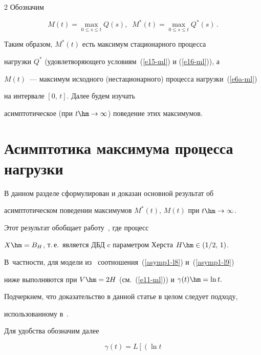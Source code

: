 \begin{multicols}{2}
Обозначим


\begin{equation*}


M(t)=\max\limits_{0 \leq s \leq t}Q(s),\;\; M^*(t)=\max\limits_{0 \leq s \leq


t}Q^*(s)\,. 




\end{equation*}


Таким образом, $M^*(t)$  есть  максимум стационарного процесса


нагрузки $Q^*$ (удовлетворяющего условиям~(\ref{e15-ml}) и (\ref{e16-ml})), а


$M(t)$~--- максимум исходного (нестационарного) процесса нагрузки~(\ref{e6a-ml}) 


на интервале $[0,\,t]$. Далее будем изучать


асимптотическое (при $t\hm\to \infty$) поведение этих максимумов.





\section{Асимптотика  максимума процесса нагрузки}





В данном разделе сформулирован и доказан основной результат об


асимптотическом поведении  максимумов $M^*(t),\,M(t)$ при $t\hm\to \infty$. 


Этот результат   обобщает  работу~\cite{Zeevi}, где процесс


$X\hm=B_H$, т.\,е.\  является  ДБД  c параметром Херста  $H\hm\in (1/2,\,1)$. 


В~част\-ности, для модели из~\cite{Zeevi} соотношения~(\ref{asymp1-l8}) и~(\ref{asymp1-l9}) 


ниже  выполняются при $V\hm=2H$ (см.~(\ref{e11-ml})) и  $\gamma(t)\hm=\ln t.$


 Подчеркнем, что доказательство в данной статье в целом следует подходу,


использованному в~\cite{Zeevi}.





Для удобства обозначим далее


\begin{equation*}


\gamma(t)=L\left[\left(\ln t



\end{equation*}
\end{multicols}
